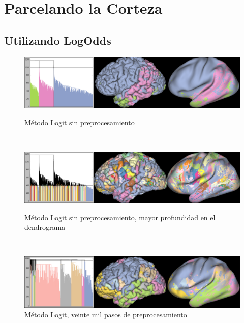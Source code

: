 \section{Parcelando la Corteza}

\subsection{Utilizando LogOdds}

\begin{figure}[h!]
                                                                                                                        
\begin{minipage}[b]{\textwidth}
    \includegraphics[width=\textwidth]{img/all_brain/logit_0.png}
    \caption{M\'etodo Logit sin preprocesamiento}
    \label{fig:dmri}
\end{minipage} ~
                                                                                                                        
\begin{minipage}[b]{\textwidth}
    \includegraphics[width=\textwidth]{img/all_brain/logit_0_deep.png}
    \caption{M\'etodo Logit sin preprocesamiento, mayor profundidad en el 
            dendrograma}

\end{minipage} ~

\begin{minipage}[b]{\textwidth}
    \includegraphics[width=\textwidth]{img/all_brain/logit_20000.png}
    \caption{M\'etodo Logit, veinte mil pasos de preprocesamiento}


\end{minipage}
\end{figure}
